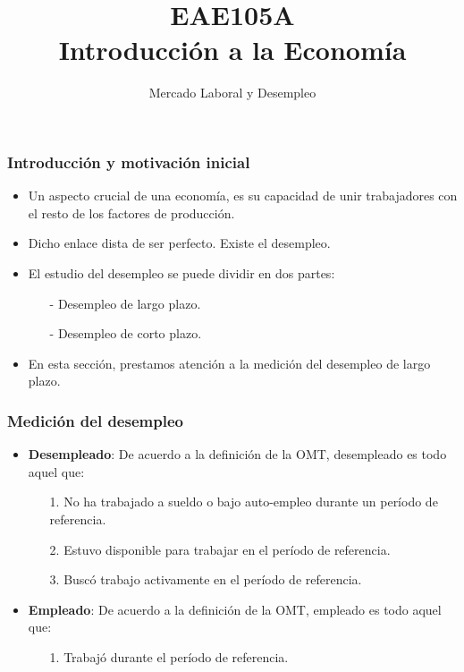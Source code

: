 \documentclass{beamer}
\title[EAE105A]{EAE105A \\ Introducci\'on a la Econom\'ia}
\subtitle[Mercado Laboral y Desempleo]{Mercado Laboral y Desempleo}
\institute[PUC]{Instituto de Econom\'ia\\
Pontificia Universidad Cat\'olica de Chile}
\date[$\:$]
\begin{document}
\maketitle

\begin{frame}
\frametitle{Introducci\'on y motivaci\'on inicial}
\begin{itemize}
\setlength\itemsep{1.4em}
\item Un aspecto crucial de una econom\'ia, es su capacidad de unir trabajadores con el resto de los factores de producci\'on.\\
\item Dicho enlace dista de ser perfecto. Existe el desempleo.
\item El estudio del desempleo se puede dividir en dos partes:\\
\begin{itemize}
\setlength\itemsep{0.6em}
\item[-] Desempleo de largo plazo.
\item[-] Desempleo de corto plazo.
\end{itemize}
\item En esta secci\'on, prestamos atenci\'on a la medici\'on del desempleo de largo plazo.
\end{itemize}
\end{frame}

\begin{frame}
\frametitle{Medici\'on del desempleo}
\begin{itemize}
\setlength\itemsep{1.0em}
\item \textbf{Desempleado}: De acuerdo a la definici\'on de la OMT, desempleado es todo aquel que:\\
\vspace{2mm}
\begin{itemize}
\setlength\itemsep{1.0em}
\item[1.] No ha trabajado a sueldo o bajo auto-empleo durante un per\'iodo de referencia.
\item[2.] Estuvo disponible para trabajar en el per\'iodo de referencia.
\item[3.] Busc\'o trabajo activamente en el per\'iodo de referencia.
\end{itemize}
\item \textbf{Empleado}: De acuerdo a la definici\'on de la OMT, empleado es todo aquel que:
\vspace{2mm}
\begin{itemize}
\item[1.] Trabaj\'o durante el per\'iodo de referencia.
\end{itemize}
\end{itemize}
\end{frame}
\end{document}
